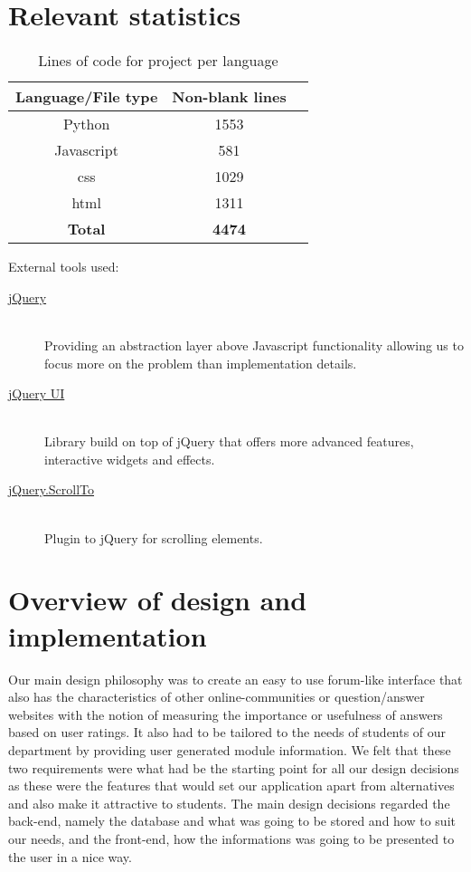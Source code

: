 \documentclass[12pt,a4paper,titlepage]{article}
\begin{document}
\section{Relevant statistics}
\begin{table}[!htbp]
\centering
\begin{tabular}{| c |c |c|}
\hline
\bf{Language/File type} & \bf{Non-blank lines}\\
\hline
Python & 1553\\
\hline
Javascript & 581 \\
\hline
css & 1029 \\
\hline
html & 1311\\
\hline
\bf{Total} & \bf{4474}\\
\hline
\end{tabular}
\caption{Lines of code for project per language}
\end{table}
External tools used:
\begin{description}
\item[\href{http://jquery.com/}{jQuery}]\hfill\\
Providing an abstraction layer above Javascript functionality allowing us to focus more on the problem than implementation details.
\item[\href{http://jqueryui.com/}{jQuery UI}]\hfill\\
Library build on top of jQuery that offers more advanced features, interactive widgets and effects.
\item[\href{http://flesler.blogspot.co.uk/2007/10/jqueryscrollto.html}{jQuery.ScrollTo}]\hfill\\
Plugin to jQuery for scrolling elements.
\end{description}
\newpage
\section{Overview of design and implementation}
Our main design philosophy was to create an easy to use forum-like interface that also has the characteristics of other online-communities or question/answer websites with the notion of measuring the importance or usefulness of answers based on user ratings. It also had to be tailored to the needs of students of our department by providing user generated module information. We felt that these two requirements were what had be the starting point for all our design decisions as these were the features that would set our application apart from alternatives and also make it attractive to students. The main design decisions regarded the back-end, namely the database and what was going to be stored and how to suit our needs, and the front-end, how the informations was going to be presented to the user in a nice way.
\end{document}
